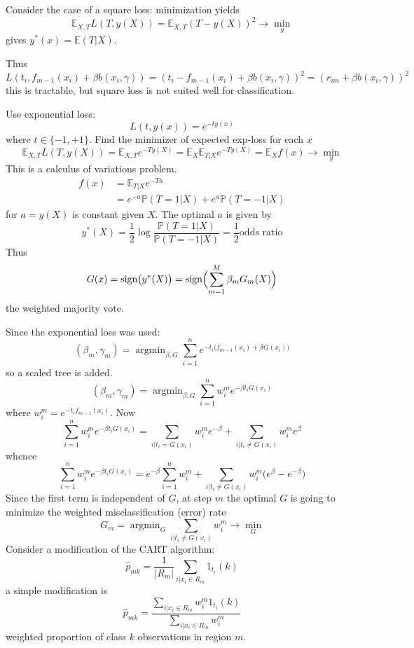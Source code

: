 \documentclass[a4paper]{article}
\newcommand{\ex}{\mathbb{E}}
\newcommand{\pr}[0]{{\mathbb{P}}}
\newcommand{\argmin}{\mathop{\text{argmin}}}
\begin{document}
Consider the case of a square loss: minimization yields
\[ \ex_{X,T} L(T, y(X)) = \ex_{X,T} (T - y(X))^2 \to \min_y \]
gives $y^*(x) = \ex(T|X)$.

Thus
\[
L(t_i,f_{m-1}(x_i) + \beta b(x_i, \gamma))
= (t_i - f_{m-1}(x_i) + \beta b(x_i, \gamma))^2
= (r_{im} + \beta b(x_i, \gamma))^2
\]
this is tractable, but square loss is not suited well for classification.

Use exponential loss:
\[L(t,y(x)) = e^{-t y(x)} \]
where $t\in\{-1,+1\}$. 
Find the minimizer of expected exp-loss for each $x$
\[
\ex_{X,T} L(T, y(X))
= \ex_{X,T} e^{ - T y(X)}
= \ex_X \ex_{T|X} e^{ - T y(X)}
= \ex_X f(x)
\to \min_y
\]
This is a calculus of variations problem.
\begin{align*}
	f(x) &= \ex_{T|X} e^{ - T a }\\
	&= e^{ - a } \pr(T=1|X) + e^{ a } \pr(T=-1|X)
\end{align*}
for $a=y(X)$ is constant given $X$. The optimal $a$ is given by
\[
y^*(X)
= \frac{1}{2} \log\frac{\pr(T=1|X)}{\pr(T=-1|X)}
= \frac{1}{2} \text{odds ratio}
\]
Thus
\[
G(x)
= \text{sign} \bigl( y^*(X)\bigr)
= \text{sign} \Bigl( \sum_{m=1}^M \beta_m G_m(X) \Bigr)
\]
the weighted majority vote.

Since the exponential loss was used:
\[
(\beta_m, \gamma_m) 
= \argmin_{\beta, G} \sum_{i=1}^n e^{-t_i\bigl(f_{m-1}(x_i) + \beta G(x_i) \bigr)}
\]
so a scaled tree is added.
\[
(\beta_m, \gamma_m)
= \argmin_{\beta, G} \sum_{i=1}^n w^m_i e^{- \beta t_i G(x_i)}
\]
where $w^m_i = e^{-t_i f_{m-1}(x_i)}$. Now
\[
\sum_{i=1}^n w^m_i e^{- \beta t_i G(x_i)}
= \sum_{i| t_i = G(x_i)} w^m_i e^{- \beta} 
+ \sum_{i| t_i \neq G(x_i)} w^m_i e^\beta
\]
whence
\[
\sum_{i=1}^n w^m_i e^{- \beta t_i G(x_i)}
= e^{- \beta} \sum_{i=1}^n w^m_i
+ \sum_{i| t_i \neq G(x_i)} w^m_i \bigl( e^\beta - e^{- \beta} \bigr)
\]
Since the first term is independent of $G$, at step $m$ the optimal $G$ is
going to minimize the weighted misclassification (error) rate
\[
G_m = \argmin_G \sum_{i| t_i \neq G(x_i)} w^m_i \to \min_G
\]
Consider a modification of the CART algorithm:
\[\hat{p}_{mk} = \frac{1}{|R_m|} \sum_{i|x_i\in R_m} 1_{t_i}(k)\]
a simple modification is
\[\hat{p}_{mk} = \frac{ \sum_{i|x_i\in R_m} w^m_i 1_{t_i}(k) }{ \sum_{i|x_i\in R_m} w^m_i }\]
weighted proportion of class $k$ observations in region $m$.



\end{document}
